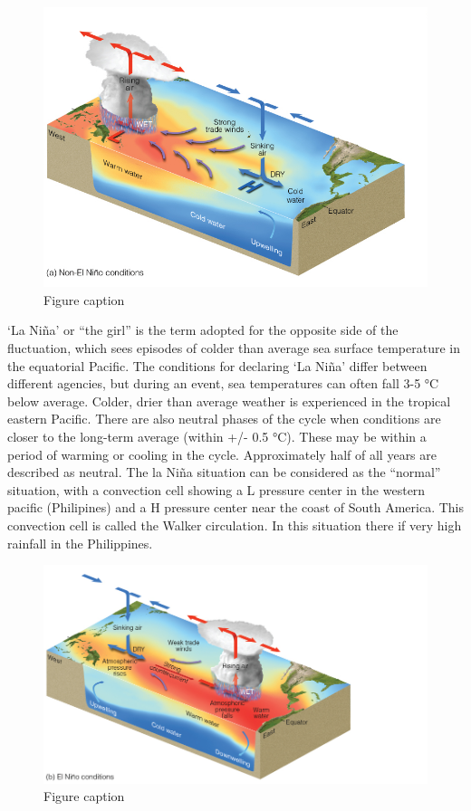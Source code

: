 \documentclass[12pt,oneside]{book}
\begin{document}
\begin{figure}

{\centering \includegraphics[width=0.8\linewidth]{figures/Figure533a} 

}

\caption{Figure caption}\label{fig:Fig533a}
\end{figure}

`La Niña' or ``the girl'' is the term adopted for the opposite side of
the fluctuation, which sees episodes of colder than average sea surface
temperature in the equatorial Pacific. The conditions for declaring `La
Niña' differ between different agencies, but during an event, sea
temperatures can often fall 3-5 °C below average. Colder, drier than
average weather is experienced in the tropical eastern Pacific. There
are also neutral phases of the cycle when conditions are closer to the
long-term average (within +/- 0.5 °C). These may be within a period of
warming or cooling in the cycle. Approximately half of all years are
described as neutral. The la Niña situation can be considered as the
``normal'' situation, with a convection cell showing a L pressure center
in the western pacific (Philipines) and a H pressure center near the
coast of South America. This convection cell is called the Walker
circulation. In this situation there if very high rainfall in the
Philippines.

\begin{figure}

{\centering \includegraphics[width=0.8\linewidth]{figures/Figure533b} 

}

\caption{Figure caption}\label{fig:Fig533b}
\end{figure}
\end{document}

